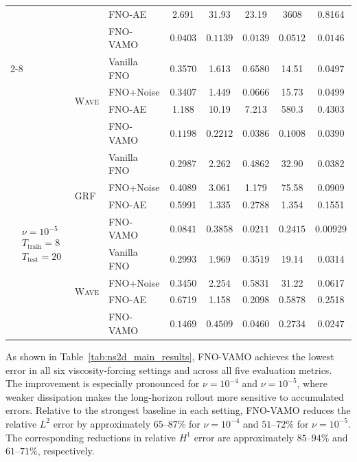 \documentclass[11pt]{article}
\begin{document}
\begin{table}[htbp]
{\begin{tabular}{lllccccc}
&
& FNO-AE      & 2.691 & 31.93 & 23.19 & 3608 & 0.8164 \\
&
& FNO-VAMO    & $\mathbf{0.0403}$ & $\mathbf{0.1139}$ & $\mathbf{0.0139}$ & $\mathbf{0.0512}$ & $\mathbf{0.0146}$ \\
\cmidrule(lr){2-8}
& \multirow{4}{*}{\textsc{Wave}}
& Vanilla FNO         & 0.3570 & 1.613 & 0.6580 & 14.51 & 0.0497 \\
&
& FNO+Noise   & 0.3407 & 1.449 & 0.0666 & 15.73 & 0.0499 \\
&
& FNO-AE      & 1.188 & 10.19 & 7.213 & 580.3 & 0.4303 \\
&
& FNO-VAMO    & $\mathbf{0.1198}$ & $\mathbf{0.2212}$ & $\mathbf{0.0386}$ & $\mathbf{0.1008}$ & $\mathbf{0.0390}$ \\
\midrule
\multirow{8}{*}{$\begin{aligned}
&\nu=10^{-5}\\ &T_\text{train}=8 \\ &T_\text{test}=20 
\end{aligned}$}
& \multirow{4}{*}{GRF}
& Vanilla FNO         & 0.2987 & 2.262 & 0.4862 & 32.90 & 0.0382 \\
&
& FNO+Noise   & 0.4089 & 3.061 & 1.179 & 75.58 & 0.0909 \\
&
& FNO-AE      & 0.5991 & 1.335 & 0.2788 & 1.354 & 0.1551 \\
&
& FNO-VAMO    & $\mathbf{0.0841}$ & $\mathbf{0.3858}$ & $\mathbf{0.0211}$ & $\mathbf{0.2415}$ & $\mathbf{0.00929}$ \\
\cmidrule(lr){2-8}
& \multirow{4}{*}{\textsc{Wave}}
& Vanilla FNO & 0.2993 & 1.969 & 0.3519 & 19.14 & 0.0314 \\
&
& FNO+Noise   & 0.3450 & 2.254 & 0.5831 & 31.22 & 0.0617 \\
&
& FNO-AE      & 0.6719 & 1.158 & 0.2098 & 0.5878 & 0.2518 \\
&
& FNO-VAMO    & $\mathbf{0.1469}$ & $\mathbf{0.4509}$ & $\mathbf{0.0460}$ & $\mathbf{0.2734}$ & $\mathbf{0.0247}$ \\
\bottomrule
\end{tabular}
}
\end{table}

As shown in Table~\ref{tab:ns2d_main_results}, FNO-VAMO achieves the lowest error in all six viscosity-forcing settings and across all five evaluation metrics. The improvement is especially pronounced for $\nu=10^{-4}$ and $\nu=10^{-5}$, where weaker dissipation makes the long-horizon rollout more sensitive to accumulated errors. Relative to the strongest baseline in each setting, FNO-VAMO reduces the relative $L^2$ error by approximately $65$--$87\%$ for $\nu=10^{-4}$ and $51$--$72\%$ for $\nu=10^{-5}$. The corresponding reductions in relative $H^1$ error are approximately $85$--$94\%$ and $61$--$71\%$, respectively.
\end{document}
